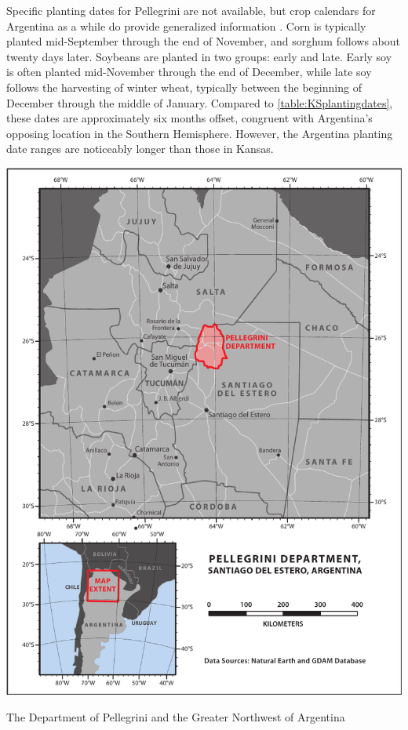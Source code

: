 Specific planting dates for Pellegrini are not available, but crop calendars for Argentina as a while do provide generalized information \autocites{agriculture-for2008foreign}{sacks2010crop}{soybean-and-cor2013argentina}. Corn is typically planted mid-September through the end of November, and sorghum follows about twenty days later. Soybeans are planted in two groups: early and late. Early soy is often planted mid-November through the end of December, while late soy follows the harvesting of winter wheat, typically between the beginning of December through the middle of January. Compared to \autoref{table:KSplantingdates}, these dates are approximately six months offset, congruent with Argentina's opposing location in the Southern Hemisphere. However, the Argentina planting date ranges are noticeably longer than those in Kansas.


\begin{ssfigure}
  \centering
  \includegraphics[width=\textwidth]{Graphics/argentinaOverview.pdf}
  \caption{The Department of Pellegrini and the Greater Northwest of Argentina}
  \label{map:argentinaOverview}
\end{ssfigure}

